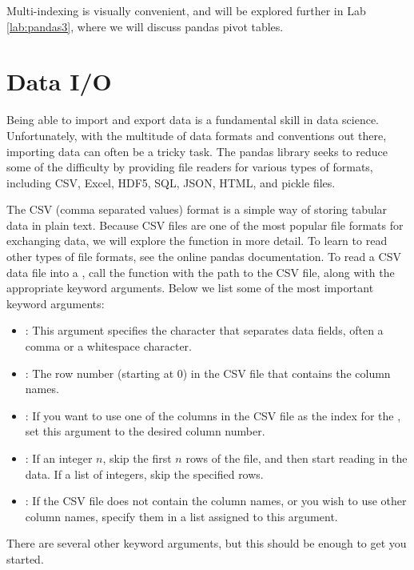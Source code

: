 Multi-indexing is visually convenient, and will be explored further in Lab
\ref{lab:pandas3}, where we will discuss pandas pivot tables.

\section*{Data I/O}
Being able to import and export data is a fundamental skill in data science.
Unfortunately, with the multitude of data formats and conventions out there,
importing data can often be a tricky task. The pandas library seeks to reduce
some of the difficulty by providing file readers for various types of formats,
including CSV, Excel, HDF5, SQL, JSON, HTML, and pickle files.

The CSV (comma separated values) format is a simple way of storing tabular data
in plain text. Because CSV files are one of the most popular file formats for
exchanging data, we will explore the  function in more detail.
To learn to read other types of file formats, see the online pandas
documentation. To read a CSV data file into a , call the
 function with the path to the CSV file, along with the
appropriate keyword arguments. Below we list some of the most important keyword
arguments:
\begin{itemize}
\item {}:
This argument specifies the character that separates data fields, often a
comma or a whitespace character.

\item {}:
The row number (starting at 0) in the CSV file that contains the column names.

\item {}:
If you want to use one of the columns in the CSV file as the index for the
, set this argument to the desired column number.

\item {}:
If an integer $n$, skip the first $n$ rows of the file, and then start reading
in the data. If a list of integers, skip the specified rows.

\item {}:
If the CSV file does not contain the column names, or you wish to use other
column names, specify them in a list assigned to this argument.

\end{itemize}
There are several other keyword arguments, but this should be enough to get you
started.

